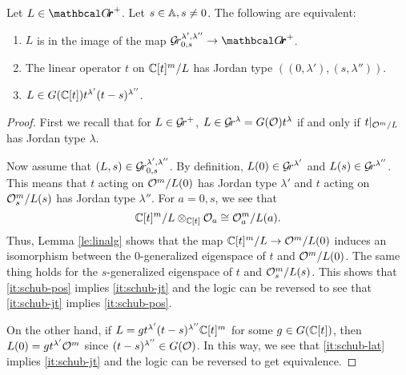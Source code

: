 \documentclass{article} %
\begin{document}
\begin{lemma} 
\label{le:Grl1l2}
    Let $ L \in \Grth^+ $.  Let $ s \in \AA, s \ne 0 $.  The following are equivalent:
    \begin{enumerate}[label=(\roman*)]
        \item \label{it:schub-pos} $ L $ is in the image of the map $ \Gr^{\lambda', \lambda''}_{0,s} \rightarrow \Grth^+$. %
        \item \label{it:schub-jt} The linear operator $ t $ on $ \CC[t]^m/L$ has Jordan type $((0,\lambda'), (s,\lambda''))$.
        \item \label{it:schub-lat} $ L \in G(\CC[t]) t^{\lambda'} (t-s)^{\lambda''}$.
    \end{enumerate}
\end{lemma}
% 
\begin{proof}
First we recall that for $ L \in \Gr^+$, $ L \in \Gr^{\lambda} = G(\cO)t^\lambda $ if and only if $ t |_{\cO^m/L} $ has Jordan type $ \lambda$. 

Now assume that $ (L, s) \in \Gr^{\lambda', \lambda''}_{0,s}$.  By definition, $ L(0) \in \Gr^{\lambda'}$ and $L(s) \in \Gr^{\lambda''} $.  This means that $t $ acting on 
$\cO^m/L(0)$ has Jordan type $ \lambda'$ and $ t$ acting on 
$\cO_s^m/L(s)$ has Jordan type $ \lambda''$.  For $ a = 0, s$,  we see that $$\CC[t]^m/L \otimes_{\CC[t]} \cO_a \cong \cO_a^m / L(a). $$
Thus, Lemma \ref{le:linalg} shows that the map
$\CC[t]^m/L\to \cO^m/L(0)$ induces an isomorphism between the $0$-generalized eigenspace of $ t$ and $ \cO^m / L(0)$.   The same thing holds for the $s$-generalized eigenspace of $t $ and $ \cO_s^m/L(s)$. This shows that \cref{it:schub-pos} implies \cref{it:schub-jt} and the logic can be reversed to see that \cref{it:schub-jt} implies \cref{it:schub-pos}. 

On the other hand, if $ L = g t^{\lambda'} (t-s)^{\lambda''} \CC[t]^m$ for some $ g \in G(\CC[t])$, then $ L(0) = g t^{\lambda'}\cO^m $ since 
$ (t-s)^{\lambda''} \in G(\cO)$. In this way, we see that \cref{it:schub-lat} implies \cref{it:schub-jt} and the logic can be reversed to get equivalence.
\end{proof}
\end{document}
